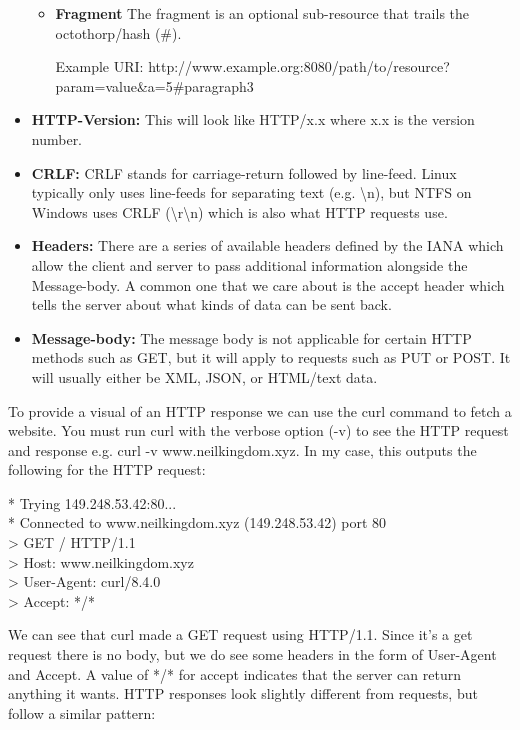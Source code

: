 \documentclass{article}
\begin{document}
\begin{itemize}
{\begin{itemize}
   \item{%
       \textbf{Fragment} The fragment is an optional sub-resource that trails the octothorp/hash (#).
   }

   Example URI: http://www.example.org:8080/path/to/resource?param=value\&a=5\#paragraph3

   \end{itemize}
}

\item{%
   \textbf{HTTP-Version:} This will look like HTTP/x.x where x.x is the version number.
}

\item{%
   \textbf{CRLF:} CRLF stands for carriage-return followed by line-feed. Linux typically only uses
   line-feeds for separating text (e.g. \textbackslash{}n), but NTFS on Windows uses CRLF
   (\textbackslash{}r\textbackslash{}n) which is also what HTTP requests use.
}

\item{%
   \textbf{Headers:} There are a series of available headers defined by the IANA which allow the
   client and server to pass additional information alongside the Message-body. A common one that we care
   about is the accept header which tells the server about what kinds of data can be sent back.
}

\item{%
   \textbf{Message-body:} The message body is not applicable for certain HTTP methods such as GET,
   but it will apply to requests such as PUT or POST. It will usually either be XML, JSON, or HTML/text data.
}

\end{itemize}

To provide a visual of an HTTP response we can use the curl command to fetch a website. You must run curl with
the verbose option (-v) to see the HTTP request and response e.g. curl -v www.neilkingdom.xyz. In my case,
this outputs the following for the HTTP request:

*   Trying 149.248.53.42:80...\\
* Connected to www.neilkingdom.xyz (149.248.53.42) port 80\\
> GET / HTTP/1.1\\
> Host: www.neilkingdom.xyz\\
> User-Agent: curl/8.4.0\\
> Accept: */*

We can see that curl made a GET request using HTTP/1.1. Since it's a get request there is no body, but we do
see some headers in the form of User-Agent and Accept. A value of */* for accept indicates that the server can
return anything it wants. HTTP responses look slightly different from requests, but follow a similar pattern:
\end{document}
